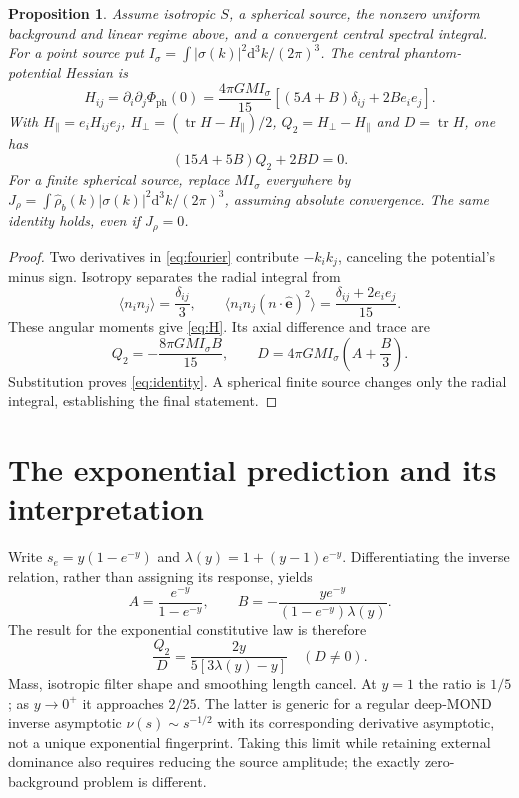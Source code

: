\documentclass[11pt,letterpaper]{article}
\newtheorem{proposition}{Proposition}
\newcommand{\ph}{\mathrm{ph}}\newcommand{\dd}{\mathrm{d}}
\newcommand{\ee}{\hat{\boldsymbol e}}\newcommand{\kk}{\hat{\boldsymbol k}}
\newcommand{\tr}{\operatorname{tr}}
\begin{document}
\begin{proposition}
Assume isotropic $S$, a spherical source, the nonzero uniform background
and linear regime above, and a convergent central spectral integral. For a
point source put $I_\sigma=\int |\sigma(k)|^2\dd^3k/(2\pi)^3$.
The central phantom-potential Hessian is
\begin{equation}
 H_{ij}=\partial_i\partial_j\Phi_{\ph}(0)
 =\frac{4\pi GM I_\sigma}{15}
 \left[(5A+B)\delta_{ij}+2B e_i e_j\right].
 \label{eq:H}
\end{equation}
With $H_\parallel=e_iH_{ij}e_j$, $H_\perp=(\tr H-H_\parallel)/2$,
$Q_2=H_\perp-H_\parallel$ and $D=\tr H$, one has
\begin{equation}
 \boxed{(15A+5B)Q_2+2BD=0.}
 \label{eq:identity}
\end{equation}
For a finite spherical source, replace $MI_\sigma$ everywhere by
$J_\rho=\int\widehat\rho_b(k)|\sigma(k)|^2\dd^3k/(2\pi)^3$, assuming absolute
convergence. The same identity holds, even if $J_\rho=0$.
\end{proposition}
\begin{proof}
Two derivatives in \eqref{eq:fourier} contribute $-k_i k_j$, canceling the
potential's minus sign. Isotropy separates the radial integral from
\begin{equation}
 \langle n_i n_j\rangle=\frac{\delta_{ij}}3,\qquad
 \langle n_i n_j(n\cdot\ee)^2\rangle
 =\frac{\delta_{ij}+2e_i e_j}{15}.
\end{equation}
These angular moments give \eqref{eq:H}. Its axial difference and trace are
\begin{equation}
 Q_2=-\frac{8\pi GM I_\sigma B}{15},\qquad
 D=4\pi GM I_\sigma\left(A+\frac B3\right).
 \label{eq:QD}
\end{equation}
Substitution proves \eqref{eq:identity}. A spherical finite source changes
only the radial integral, establishing the final statement.
\end{proof}

\newpage
\section{The exponential prediction and its interpretation}
Write $s_e=y(1-e^{-y})$ and $\lambda(y)=1+(y-1)e^{-y}$. Differentiating the
inverse relation, rather than assigning its response, yields
\begin{equation}
 A=\frac{e^{-y}}{1-e^{-y}},\qquad
 B=-\frac{y e^{-y}}{(1-e^{-y})\lambda(y)}.
\end{equation}
The result for the exponential constitutive law is therefore
\begin{equation}
 \boxed{\frac{Q_2}{D}=\frac{2y}{5[3\lambda(y)-y]}}\quad(D\ne0).
 \label{eq:ratio}
\end{equation}
Mass, isotropic filter shape and smoothing length cancel. At $y=1$ the ratio
is $1/5$; as $y\to0^+$ it approaches $2/25$. The latter is generic for a regular
deep-MOND inverse asymptotic $\nu(s)\sim s^{-1/2}$ with its corresponding
derivative asymptotic, not a unique exponential fingerprint. Taking this
limit while retaining external dominance also requires reducing the source
amplitude; the exactly zero-background problem is different.
\end{document}
